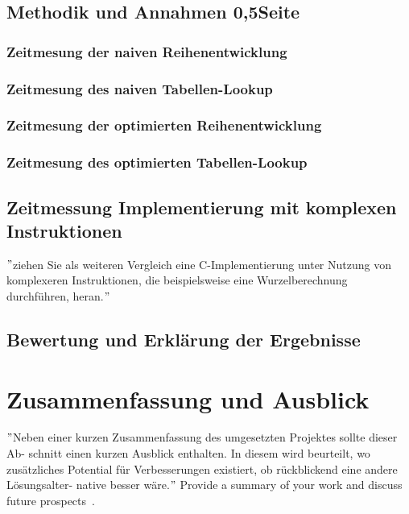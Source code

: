 \documentclass[course=erap]{aspdoc}
\begin{document}
\subsection{Methodik und Annahmen 0,5Seite}

\subsubsection{Zeitmesung der naiven Reihenentwicklung}
\subsubsection{Zeitmesung des naiven Tabellen-Lookup}
\subsubsection{Zeitmesung der optimierten Reihenentwicklung}
\subsubsection{Zeitmesung des optimierten Tabellen-Lookup}

\subsection{Zeitmessung Implementierung mit komplexen Instruktionen}
\("\)ziehen Sie als weiteren Vergleich eine C-Implementierung unter Nutzung von komplexeren Instruktionen, die beispielsweise eine Wurzelberechnung durchführen, heran.\("\)

\subsection{Bewertung und Erklärung der Ergebnisse}



\section{Zusammenfassung und Ausblick}
\("\)Neben einer kurzen Zusammenfassung des umgesetzten Projektes sollte dieser Ab- schnitt einen kurzen Ausblick enthalten. In diesem wird beurteilt, wo zusätzliches Potential für Verbesserungen existiert, ob rückblickend eine andere Lösungsalter- native besser wäre.\("\)
Provide a summary of your work and discuss future prospects~\cite{intel2017man}.




{}
\end{document}
